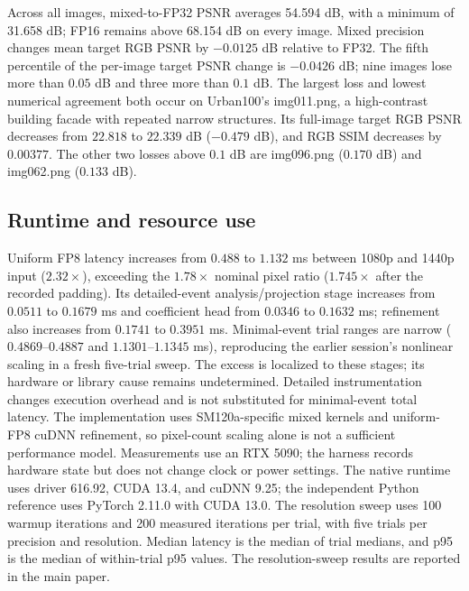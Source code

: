 \documentclass[10pt,twocolumn,letterpaper]{article}
\begin{document}
Across all images, mixed-to-FP32 PSNR averages 54.594 dB, with a minimum of 31.658 dB; FP16 remains above 68.154 dB on every image.
Mixed precision changes mean target RGB PSNR by $-0.0125$ dB relative to FP32.
The fifth percentile of the per-image target PSNR change is $-0.0426$ dB; nine images lose more than $0.05$ dB and three more than $0.1$ dB.
The largest loss and lowest numerical agreement both occur on Urban100's \textnormal{img011.png}, a high-contrast building facade with repeated narrow structures.
Its full-image target RGB PSNR decreases from $22.818$ to $22.339$ dB ($-0.479$ dB), and RGB SSIM decreases by $0.00377$.
The other two losses above $0.1$ dB are \textnormal{img096.png} ($0.170$ dB) and \textnormal{img062.png} ($0.133$ dB).

\subsection{Runtime and resource use}

Uniform FP8 latency increases from $0.488$ to $1.132$ ms between 1080p and 1440p input ($2.32\times$), exceeding the $1.78\times$ nominal pixel ratio ($1.745\times$ after the recorded padding).
Its detailed-event analysis/projection stage increases from $0.0511$ to $0.1679$ ms and coefficient head from $0.0346$ to $0.1632$ ms; refinement also increases from $0.1741$ to $0.3951$ ms.
Minimal-event trial ranges are narrow ($0.4869$--$0.4887$ and $1.1301$--$1.1345$ ms), reproducing the earlier session's nonlinear scaling in a fresh five-trial sweep.
The excess is localized to these stages; its hardware or library cause remains undetermined.
Detailed instrumentation changes execution overhead and is not substituted for minimal-event total latency.
The implementation uses SM120a-specific mixed kernels and uniform-FP8 cuDNN refinement, so pixel-count scaling alone is not a sufficient performance model.
\label{sec:timing}
Measurements use an RTX 5090; the harness records hardware state but does not change clock or power settings.
The native runtime uses driver 616.92, CUDA 13.4, and cuDNN 9.25; the independent Python reference uses PyTorch 2.11.0 with CUDA 13.0.
The resolution sweep uses 100 warmup iterations and 200 measured iterations per trial, with five trials per precision and resolution.
Median latency is the median of trial medians, and p95 is the median of within-trial p95 values.
The resolution-sweep results are reported in the main paper.
\end{document}

